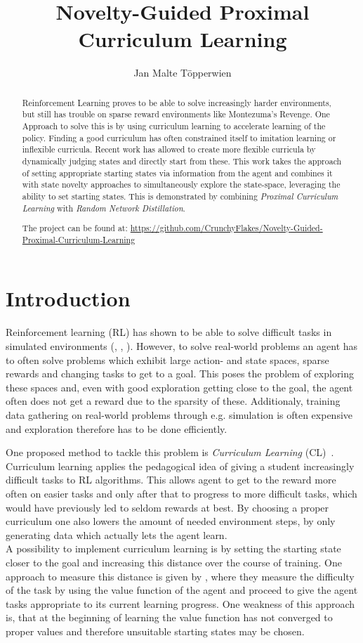 \documentclass{article}
\title{Novelty-Guided Proximal Curriculum Learning}
\author{Jan Malte Töpperwien}
\begin{document}
\maketitle
\begin{abstract}
  Reinforcement Learning proves to be able to solve increasingly harder environments, but still has trouble on sparse reward environments like Montezuma's Revenge. One Approach to solve this is by using curriculum learning to accelerate learning of the policy. Finding a good curriculum has often constrained itself to imitation learning or inflexible curricula. Recent work has allowed to create more flexible curricula by dynamically judging states and directly start from these. This work takes the approach of setting appropriate starting states via information from the agent and combines it with state novelty approaches to simultaneously explore the state-space, leveraging the ability to set starting states. This is demonstrated by combining \textit{Proximal Curriculum Learning} with \textit{Random Network Distillation}.

  The project can be found at: \url{https://github.com/CrunchyFlakes/Novelty-Guided-Proximal-Curriculum-Learning}
\end{abstract}
\section{Introduction}
Reinforcement learning (RL) has shown to be able to solve difficult tasks in simulated environments (\citep{human_level_control}, \citep{continuous_control}, \citep{rl_go}). However, to solve real-world problems an agent has to often solve problems which exhibit large action- and state spaces, sparse rewards and changing tasks to get to a goal. This poses the problem of exploring these spaces and, even with good exploration getting close to the goal, the agent often does not get a reward due to the sparsity of these. Additionaly, training data gathering on real-world problems through e.g. simulation is often expensive and exploration therefore has to be done efficiently.

One proposed method to tackle this problem is \textit{Curriculum Learning} (CL)~\citep{curr}. Curriculum learning applies the pedagogical idea of giving a student increasingly difficult tasks to RL algorithms. This allows agent to get to the reward more often on easier tasks and only after that to progress to more difficult tasks, which would have previously led to seldom rewards at best. By choosing a proper curriculum one also lowers the amount of needed environment steps, by only generating data which actually lets the agent learn. \\
A possibility to implement curriculum learning is by setting the starting state closer to the goal and increasing this distance over the course of training. One approach to measure this distance is given by \cite{prox_curr}, where they measure the difficulty of the task by using the value function of the agent and proceed to give the agent tasks appropriate to its current learning progress. One weakness of this approach is, that at the beginning of learning the value function has not converged to proper values and therefore unsuitable starting states may be chosen.
\end{document}
